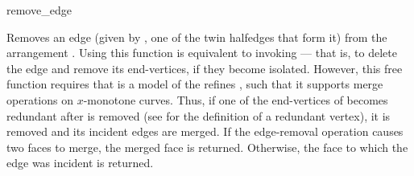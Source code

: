 
\ccRefPageBegin

\begin{ccRefFunction}{remove_edge}


   {Removes an edge (given by , one of the twin halfedges that form it)
    from the arrangement . Using this function is equivalent to
    invoking  --- that is, to delete the
    edge and remove its end-vertices, if they become isolated. However, this
    free function requires that  is a model of the refines
    , such that it supports merge operations
    on $x$-monotone curves. Thus, if one of the end-vertices of  becomes
    redundant after  is removed (see  for the
    definition of a redundant vertex), it is removed and its
    incident edges are merged.
    If the edge-removal operation causes two faces to merge, the merged face
    is returned. Otherwise, the face to which the edge was incident is
    returned.}

\end{ccRefFunction}

\ccRefPageEnd
